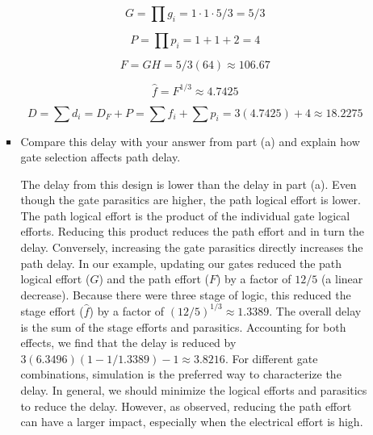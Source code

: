 \documentclass[fleqn]{article}
\begin{document}
\begin{enumerate}
\begin{enumerate}
\begin{itemize}
				\begin{equation*}
					G = \prod{g_i} = 1 \cdot 1 \cdot 5/3 = 5/3
				\end{equation*}
				
				\begin{equation*}
					P = \prod{p_i} = 1 + 1 + 2 = 4
				\end{equation*}
				
				\begin{equation*}
					F = GH = 5/3(64) \approx 106.67
				\end{equation*}
				
				\begin{equation*}
					\hat{f} = F^{1/3} \approx 4.7425
				\end{equation*}
				
				\begin{equation*}
					D = \sum{d_i} = D_F + P = \sum{f_i} + \sum{p_i} = 3(4.7425) + 4 \approx \mathbf{18.2275}
				\end{equation*}
				
				\item Compare this delay with your answer from part (a) and explain how gate selection affects path delay.
				
				The delay from this design is lower than the delay in part (a). Even though the gate parasitics are higher, the path logical effort is lower. The path logical effort is the product of the individual gate logical efforts. Reducing this product reduces the path effort and in turn the delay. Conversely, increasing the gate parasitics directly increases the path delay. In our example, updating our gates reduced the path logical effort ($G$) and the path effort ($F$) by a factor of $12/5$ (a linear decrease). Because there were three stage of logic, this reduced the stage effort ($\hat{f}$) by a factor of $(12/5)^{1/3} \approx 1.3389$. The overall delay is the sum of the stage efforts and parasitics. Accounting for both effects, we find that the delay is reduced by $3(6.3496)(1 - 1/1.3389) - 1 \approx 3.8216$. For different gate combinations, simulation is the preferred way to characterize the delay. In general, we should minimize the logical efforts and parasitics to reduce the delay. However, as observed, reducing the path effort can have a larger impact, especially when the electrical effort is high.
				
			\end{itemize}
		\end{enumerate}
		

\end{enumerate}
\end{document}
